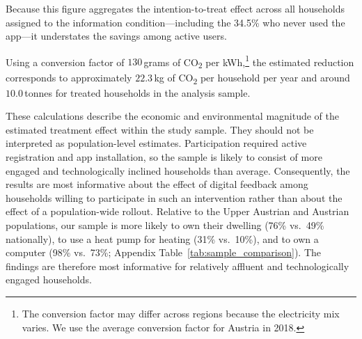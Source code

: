 Because this figure aggregates the intention-to-treat effect across all households assigned to the information condition---including the 34.5\% who never used the app---it understates the savings among active users.

Using a conversion factor of $130$\,grams of CO\textsubscript{2} per kWh,\footnote{The conversion factor may differ across regions because the electricity mix varies. We use the average conversion factor for Austria in 2018.} the estimated reduction corresponds to approximately $22.3$\,kg of CO\textsubscript{2} per household per year and around $10.0$\,tonnes for treated households in the analysis sample.

These calculations describe the economic and environmental magnitude of the estimated treatment effect within the study sample. They should not be interpreted as population-level estimates. Participation required active registration and app installation, so the sample is likely to consist of more engaged and technologically inclined households than average. Consequently, the results are most informative about the effect of digital feedback among households willing to participate in such an intervention rather than about the effect of a population-wide rollout. Relative to the Upper Austrian and Austrian populations, our sample is more likely to own their dwelling (76\% vs.\ 49\% nationally), to use a heat pump for heating (31\% vs.\ 10\%), and to own a computer (98\% vs.\ 73\%; Appendix Table~\ref{tab:sample_comparison}). The findings are therefore most informative for relatively affluent and technologically engaged households.


